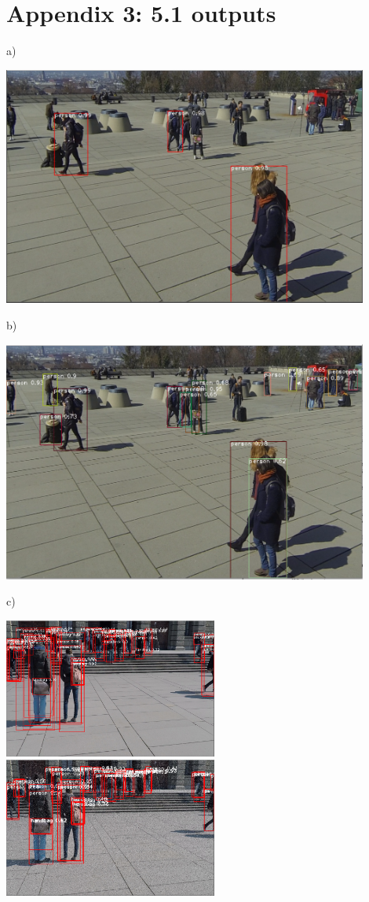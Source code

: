 \documentclass[12pt]{report}
\begin{document}
\section*{Appendix 3: 5.1 outputs}

a)

\includegraphics[width=120mm]{./images/appendix/image298confidence.PNG}

b)

\includegraphics[width=120mm]{./images/appendix/NMS0.6.PNG}

c)

\includegraphics[width=70mm]{./images/appendix/NoConfidenceNoAug.PNG}
\includegraphics[width=70mm]{./images/appendix/NoConfidenceAug10.PNG}
\end{document}
